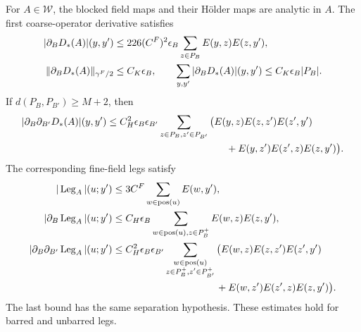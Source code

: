 \begin{proposition}\label{prop:interacting-local-insertions}
For $A\in\mathcal W$, the blocked field maps and
their Hölder maps are analytic in $A$. The first
coarse-operator derivative satisfies
\begin{align}
 |\partial_BD_*(A)|(y,y')
  &\le226(C^F)^2\epsilon_B
       \sum_{z\in P_B}E(y,z)E(z,y'),\notag\\
 \|\partial_BD_*(A)\|_{\gamma^F/2}
  &\le C_K\epsilon_B,\qquad
 \sum_{y,y'}|\partial_BD_*(A)|(y,y')
                           \le C_K\epsilon_B|P_B|.
                                  \label{eq:interacting-coarse-first}
\end{align}
If $d(P_B,P_{B'})\ge M+2$, then
\begin{align}
 |\partial_B\partial_{B'}D_*(A)|(y,y')
 \le{}& C_H^2\epsilon_B\epsilon_{B'}
       \sum_{z\in P_B,z'\in P_{B'}}
       \big(E(y,z)E(z,z')E(z',y')\notag\\*
       &\hspace{38mm}+E(y,z')E(z',z)E(z,y')\big).
                                  \label{eq:interacting-coarse-mixed}
\end{align}
The corresponding fine-field legs satisfy
\begin{align}
 |\operatorname{Leg}_A|(u;y')
   &\le3C^F\sum_{w\in\operatorname{pos}(u)}E(w,y'),\notag\\
 |\partial_B\operatorname{Leg}_A|(u;y')
   &\le C_H\epsilon_B
       \sum_{w\in\operatorname{pos}(u),z\in P_B^+}E(w,z)E(z,y'),
                                  \label{eq:interacting-leg-first}\\
 |\partial_B\partial_{B'}\operatorname{Leg}_A|(u;y')
   &\le C_H^2\epsilon_B\epsilon_{B'}
       \sum_{\substack{w\in\operatorname{pos}(u)\\z\in P_B^+,z'\in P_{B'}^+}}
       \big(E(w,z)E(z,z')E(z',y')\notag\\
   &\hspace{37mm}+E(w,z')E(z',z)E(z,y')\big).
                                  \label{eq:interacting-leg-mixed}
\end{align}
The last bound has the same separation hypothesis.
These estimates hold for barred and unbarred legs.
\end{proposition}

